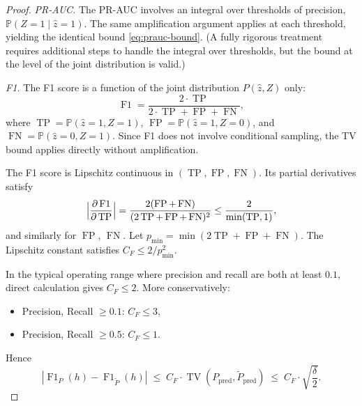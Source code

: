 \begin{proof}
\emph{PR-AUC.} The PR-AUC involves an integral over thresholds of precision,
$\mathbb{P}(Z=1 \mid \hat{z}=1)$. The same amplification argument applies at
each threshold, yielding the identical bound
\eqref{eq:prauc-bound}. (A fully rigorous treatment requires additional steps
to handle the integral over thresholds, but the bound at the level of the joint
distribution is valid.)

\emph{F1.} The F1 score is a function of the joint distribution
$P(\hat{z}, Z)$ only:
\[
\operatorname{F1} = \frac{2 \cdot \operatorname{TP}}
                         {2 \cdot \operatorname{TP}
                          + \operatorname{FP} + \operatorname{FN}},
\]
where $\operatorname{TP} = \mathbb{P}(\hat{z}=1, Z=1)$,
$\operatorname{FP} = \mathbb{P}(\hat{z}=1, Z=0)$, and
$\operatorname{FN} = \mathbb{P}(\hat{z}=0, Z=1)$. Since F1 does not involve
conditional sampling, the TV bound applies directly without amplification.

The F1 score is Lipschitz continuous in $( \operatorname{TP},
\operatorname{FP}, \operatorname{FN})$. Its partial derivatives satisfy
\[
\Bigl|\frac{\partial \operatorname{F1}}{\partial \operatorname{TP}}\Bigr|
= \frac{2(\operatorname{FP}+\operatorname{FN})}
       {(2\operatorname{TP}+\operatorname{FP}+\operatorname{FN})^2}
\leq \frac{2}{\min(\operatorname{TP}, 1)},
\]
and similarly for $\operatorname{FP}$, $\operatorname{FN}$. Let
$p_{\min} = \min(2\operatorname{TP}+\operatorname{FP}+\operatorname{FN})$.
The Lipschitz constant satisfies $C_F \leq 2/p_{\min}^2$.

In the typical operating range where precision and recall are both at least
$0.1$, direct calculation gives $C_F \leq 2$. More conservatively:
\begin{itemize}
  \item Precision, Recall $\geq 0.1$: $C_F \leq 3$,
  \item Precision, Recall $\geq 0.5$: $C_F \leq 1$.
\end{itemize}
Hence
\begin{equation}
|\operatorname{F1}_P(h) - \operatorname{F1}_{\tilde{P}}(h)|
\;\leq\; C_F \cdot \operatorname{TV}(P_{\text{pred}}, \tilde{P}_{\text{pred}})
\;\leq\; C_F \cdot \sqrt{\frac{\delta}{2}}.
\label{eq:f1-tv-transfer}
\end{equation}


\end{proof}
